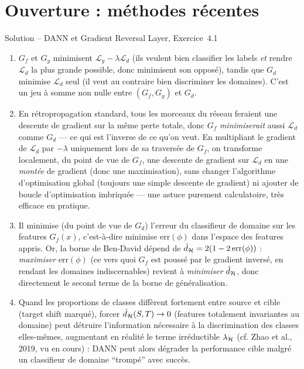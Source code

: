 \documentclass[11pt]{article}
\begin{document}
\section{Ouverture : méthodes récentes}

\begin{exercisebox}{Solution -- DANN et Gradient Reversal Layer, Exercice~4.1}
\begin{enumerate}[label=(\alph*)]
\item $G_f$ et $G_y$ minimisent $\mathcal L_y - \lambda \mathcal L_d$ (ils veulent bien classifier les
labels \emph{et} rendre $\mathcal L_d$ la plus grande possible, donc minimisent son opposé), tandis que
$G_d$ minimise $\mathcal L_d$ seul (il veut au contraire bien discriminer les domaines). C'est un jeu à
somme non nulle entre $(G_f,G_y)$ et $G_d$.
\item En rétropropagation standard, tous les morceaux du réseau feraient une descente de gradient sur la
même perte totale, donc $G_f$ \emph{minimiserait} aussi $\mathcal L_d$ comme $G_d$ --- ce qui est
l'inverse de ce qu'on veut. En multipliant le gradient de $\mathcal L_d$ par $-\lambda$ uniquement lors de
sa traversée de $G_f$, on transforme localement, du point de vue de $G_f$, une descente de gradient sur
$\mathcal L_d$ en une \emph{montée} de gradient (donc une maximisation), sans changer l'algorithme
d'optimisation global (toujours une simple descente de gradient) ni ajouter de boucle d'optimisation
imbriquée --- une astuce purement calculatoire, très efficace en pratique.
\item Il minimise (du point de vue de $G_d$) l'erreur du classifieur de domaine sur les features
$G_f(x)$, c'est-à-dire minimise $\mathrm{err}(\phi)$ dans l'espace des features appris. Or, la borne de
Ben-David dépend de $\hat d_{\mathcal{H}} = 2(1-2\,\mathrm{err}(\phi))$ : \emph{maximiser} $\mathrm{err}(\phi)$
(ce vers quoi $G_f$ est poussé par le gradient inversé, en rendant les domaines indiscernables) revient à
\emph{minimiser} $\hat d_{\mathcal{H}}$, donc directement le second terme de la borne de généralisation.
\item Quand les proportions de classes diffèrent fortement entre source et cible (target shift marqué),
forcer $\hat d_{\mathcal{H}}(S,T)\to 0$ (features totalement invariantes au domaine) peut détruire l'information
nécessaire à la discrimination des classes elles-mêmes, augmentant en réalité le terme irréductible
$\lambda_{\mathcal{H}}$ (cf. Zhao et al., 2019, vu en cours) : DANN peut alors dégrader la performance cible malgré
un classifieur de domaine \enquote{trompé} avec succès.
\end{enumerate}
\end{exercisebox}
\end{document}
